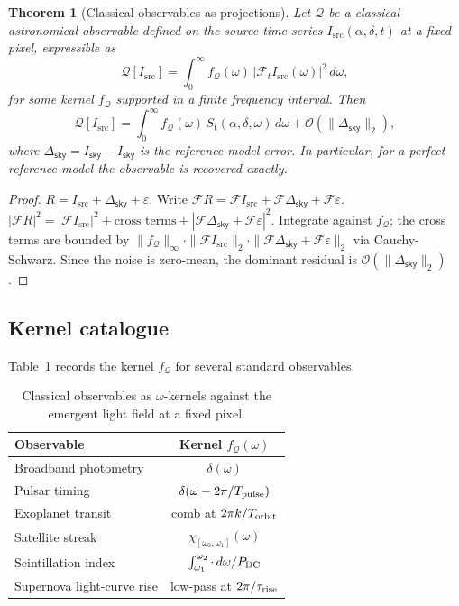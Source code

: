 \documentclass[11pt,twocolumn,a4paper]{article}
\newtheorem{theorem}{Theorem}[section]
\theoremstyle{definition}
\theoremstyle{remark}
\newcommand{\Sfield}{S_{\mathrm{t}}}
\newcommand{\RA}{\alpha}
\newcommand{\Dec}{\delta}
\newcommand{\sky}{\mathsf{sky}}
\newcommand{\src}{\mathrm{src}}
\begin{document}
\begin{theorem}[Classical observables as projections]
\label{thm:projection}
Let $\mathcal{Q}$ be a classical astronomical observable defined on
the source time-series $I_\src(\RA, \Dec, t)$ at a fixed pixel,
expressible as
\begin{equation}
\label{eq:observable}
\mathcal{Q}[I_\src] = \int_0^\infty f_\mathcal{Q}(\omega)\, \left|\mathcal{F}_t I_\src(\omega)\right|^2\, d\omega,
\end{equation}
for some kernel $f_\mathcal{Q}$ supported in a finite frequency
interval. Then
\begin{equation}
\mathcal{Q}[I_\src] = \int_0^\infty f_\mathcal{Q}(\omega)\,\Sfield(\RA,\Dec,\omega)\,d\omega + \mathcal{O}(\|\Delta_\sky\|_2),
\end{equation}
where $\Delta_\sky = I_\sky - \widehat{I}_\sky$ is the reference-model
error. In particular, for a perfect reference model the observable is
recovered exactly.
\end{theorem}

\begin{proof}
$R = I_\src + \Delta_\sky + \varepsilon$. Write
$\mathcal{F}R = \mathcal{F}I_\src + \mathcal{F}\Delta_\sky + \mathcal{F}\varepsilon$.
$|\mathcal{F}R|^2 = |\mathcal{F}I_\src|^2 + \text{cross terms} + |\mathcal{F}\Delta_\sky + \mathcal{F}\varepsilon|^2$.
Integrate against $f_\mathcal{Q}$; the cross terms are bounded by
$\|f_\mathcal{Q}\|_\infty \cdot \|\mathcal{F}I_\src\|_2 \cdot \|\mathcal{F}\Delta_\sky + \mathcal{F}\varepsilon\|_2$
via Cauchy-Schwarz. Since the noise is zero-mean, the dominant
residual is $\mathcal{O}(\|\Delta_\sky\|_2)$.
\end{proof}

\subsection{Kernel catalogue}

Table~\ref{tab:kernels} records the kernel $f_\mathcal{Q}$ for several
standard observables.

\begin{table}[H]
\centering\small
\caption{Classical observables as $\omega$-kernels against the
emergent light field at a fixed pixel.}
\label{tab:kernels}
\begin{tabular}{lc}
\toprule
Observable & Kernel $f_\mathcal{Q}(\omega)$\\
\midrule
Broadband photometry & $\delta(\omega)$ \\
Pulsar timing        & $\delta(\omega - 2\pi / T_{\rm pulse})$ \\
Exoplanet transit    & comb at $2\pi k / T_{\rm orbit}$ \\
Satellite streak     & $\chi_{[\omega_0, \omega_1]}(\omega)$ \\
Scintillation index  & $\int_{\omega_1}^{\omega_2} \cdot \, d\omega / P_{\rm DC}$ \\
Supernova light-curve rise & low-pass at $2\pi/\tau_{\rm rise}$ \\
\bottomrule
\end{tabular}
\end{table}
\end{document}
